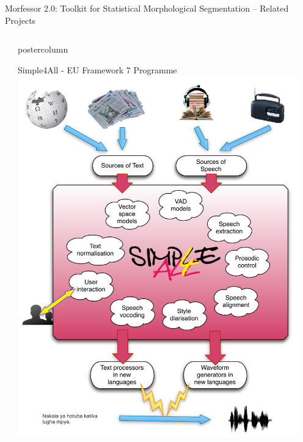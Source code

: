 \documentclass[final]{beamer} %
\begin{document}
\begin{frame}{Morfessor 2.0: Toolkit for Statistical Morphological Segmentation -- Related Projects}
\begin{columns}
\begin{column}{.49\textwidth}
\end{column}
\begin{column}{.45\textwidth}
  \begin{beamercolorbox}[center,wd=\textwidth]{postercolumn}
 \begin{block}{Simple4All - EU Framework 7 Programme}
\includegraphics[width=0.95\textwidth]{s4a}             
            \end{block}
            
	\end{beamercolorbox}
\end{column}

\end{columns}
 \end{frame}



  
\end{document}
